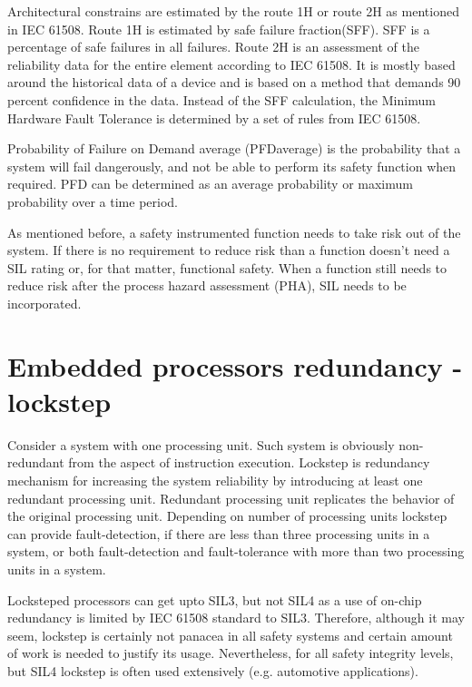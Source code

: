 Architectural constrains are estimated by the route 1H or route 2H as mentioned in IEC 61508. Route 1H is estimated by safe failure fraction(SFF). SFF is a percentage of safe failures in all failures. Route 2H is an assessment of the reliability data for the entire element according to IEC 61508. It is mostly based around the historical data of a device and is based on a method that demands 90 percent confidence in the data.  Instead of the SFF calculation, the Minimum Hardware Fault Tolerance is determined by a set of rules from IEC 61508.

Probability of Failure on Demand average (PFDaverage) is the probability that a system will fail dangerously, and not be able to perform its safety function when required. PFD can be determined as an average probability or maximum probability over a time period.

As mentioned before, a safety instrumented function needs to take risk out of the system. If there is no requirement to reduce risk than a function doesn't need a SIL rating or, for that matter, functional safety. When a function still needs to reduce risk after the process hazard assessment (PHA), SIL needs to be incorporated.


\section{Embedded processors redundancy - lockstep}

Consider a system with one processing unit. Such system is obviously non-redundant from the
aspect of instruction execution. Lockstep is redundancy mechanism for increasing the system reliability
by introducing at least one redundant processing unit. Redundant processing unit replicates the behavior of
the original processing unit. Depending on number of processing units lockstep can provide fault-detection, if there are less than three processing units in a system, or both fault-detection and
fault-tolerance with more than two processing units in a system. \citep{ipavic_lockstep}

Locksteped processors can get upto SIL3, but not SIL4 as a use of on-chip redundancy is limited by IEC 61508 standard to SIL3. Therefore, although it may seem, lockstep is certainly not panacea in all safety systems and certain amount of work is needed to justify its usage. Nevertheless, for all safety integrity levels, but SIL4 lockstep is often used extensively (e.g. automotive applications). \citep{ipavic_lockstep}

